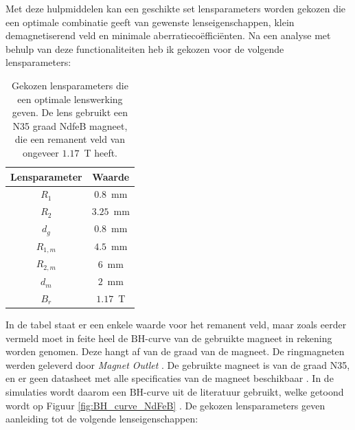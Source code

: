 \documentclass[we,twoside,openright,a4paper,11pt]{uantwerpenbamathesis}
\begin{document}
Met deze hulpmiddelen kan een geschikte set lensparameters worden gekozen die een optimale combinatie geeft van gewenste lenseigenschappen, klein demagnetiserend veld en minimale aberratiecoëfficiënten. Na een analyse met behulp van deze functionaliteiten heb ik gekozen voor de volgende lensparameters:
\begin{table}[H]
\centering
\begin{tabular}{@{}cl@{}}
\toprule
Lensparameter                     & \multicolumn{1}{c}{Waarde}  \\ \midrule
\multicolumn{1}{|c|}{$R_1$}        & \multicolumn{1}{c|}{$0.8$~mm}  \\ \midrule
\multicolumn{1}{|c|}{$R_2$}        & \multicolumn{1}{c|}{$3.25$~mm} \\ \midrule
\multicolumn{1}{|c|}{$d_g$}        & \multicolumn{1}{c|}{$0.8$~mm}  \\ \midrule
\multicolumn{1}{|c|}{$R_{1, m}$} & \multicolumn{1}{c|}{$4.5$~mm}  \\ \midrule
\multicolumn{1}{|c|}{$R_{2, m}$} & \multicolumn{1}{c|}{$6$~mm}    \\ \midrule
\multicolumn{1}{|c|}{$d_m$}        & \multicolumn{1}{c|}{$2$~mm}    \\ \midrule
\multicolumn{1}{|c|}{$B_r$}        & \multicolumn{1}{c|}{$1.17$~T} \\ \midrule
\end{tabular}
\caption{Gekozen lensparameters die een optimale lenswerking geven. De lens gebruikt een N35 graad NdfeB magneet, die een remanent veld van ongeveer $1.17$~T heeft.}\label{tab:lens_parameters}
\end{table}
In de tabel staat er een enkele waarde voor het remanent veld, maar zoals eerder vermeld moet in feite heel de $\mathrm{BH}$-curve van de gebruikte magneet in rekening worden genomen. Deze hangt af van de graad van de magneet. De ringmagneten werden geleverd door \textit{Magnet Outlet} \cite{Magnet_Outlet}. De gebruikte magneet is van de graad N35, en er geen datasheet met alle specificaties van de magneet beschikbaar \cite{Magnet_Grade}. In de simulaties wordt daarom een $\mathrm{BH}$-curve uit de literatuur gebruikt, welke getoond wordt op Figuur \ref{fig:BH_curve_NdFeB} \cite{arnold_ndfeb_2019}. De gekozen lensparameters geven aanleiding tot de volgende lenseigenschappen:
\end{document}

